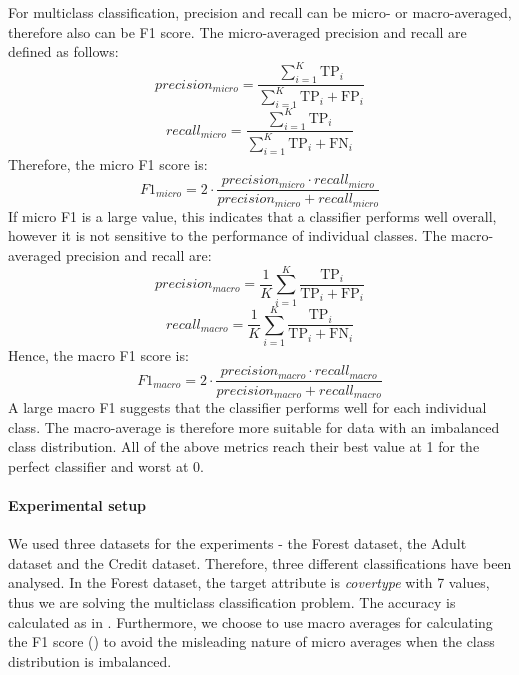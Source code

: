For multiclass classification, precision and recall can be micro- or macro-averaged, therefore also can be F1 score.
The micro-averaged precision and recall are defined as follows:
\begin{equation}
    precision_{micro} = \frac{\sum_{i=1}^{K}\text{TP}_i}{\sum_{i=1}^{K}\text{TP}_i + \text{FP}_i}
\end{equation}
\begin{equation}
    recall_{micro} = \frac{\sum_{i=1}^{K}\text{TP}_i}{\sum_{i=1}^{K}\text{TP}_i + \text{FN}_i}
\end{equation}
Therefore, the micro F1 score is: 
\begin{equation}
    F1_{micro} = 2 \cdot \frac{precision_{micro} \cdot recall_{micro}}{precision_{micro} + recall_{micro}}
\end{equation}
If micro F1 is a large value, this indicates that a classifier performs well overall, however it is not sensitive to the performance of individual classes. 
The macro-averaged precision and recall are:
\begin{equation}
    precision_{macro} = \frac{1}{K}\sum_{i=1}^{K}\frac{\text{TP}_i}{\text{TP}_i + \text{FP}_i}
\end{equation}
\begin{equation}
    recall_{macro} = \frac{1}{K}\sum_{i=1}^{K}\frac{\text{TP}_i}{\text{TP}_i + \text{FN}_i}
\end{equation}
Hence, the macro F1 score is:
\begin{equation}\label{eq:f1-macro}
    F1_{macro} = 2 \cdot \frac{precision_{macro} \cdot recall_{macro}}{precision_{macro} + recall_{macro}}
\end{equation}
A large macro F1 suggests that the classifier performs well for each individual class. The macro-average is therefore more suitable for data with an imbalanced class distribution.
All of the above metrics reach their best value at 1 for the perfect classifier and worst at 0.

\paragraph{Experimental setup}
We used three datasets for the experiments - the Forest dataset, the Adult dataset and the Credit dataset. Therefore, three different classifications have been analysed. 
In the Forest dataset, the target attribute is \textit{covertype} with 7 values, thus we are solving the multiclass classification problem. 
The accuracy is calculated as in . Furthermore, we choose to use macro averages for calculating the F1 score () to avoid the misleading nature of micro averages when the class distribution is imbalanced.

